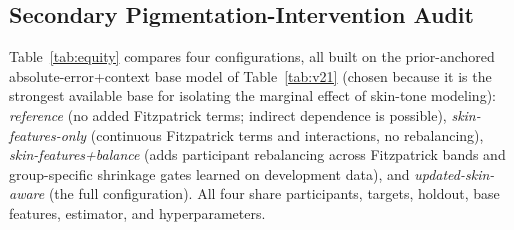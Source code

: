 \documentclass[journal]{IEEEtran}
\begin{document}
\subsection{Secondary Pigmentation-Intervention Audit}
\label{sec:equity}
Table~\ref{tab:equity} compares four configurations, all built on the prior-anchored absolute-error+context base model of Table~\ref{tab:v21} (chosen because it is the strongest available base for isolating the marginal effect of skin-tone modeling): \emph{reference} (no added Fitzpatrick terms; indirect dependence is possible), \emph{skin-features-only} (continuous Fitzpatrick terms and interactions, no rebalancing), \emph{skin-features+balance} (adds participant rebalancing across Fitzpatrick bands and group-specific shrinkage gates learned on development data), and \emph{updated-skin-aware} (the full configuration). All four share participants, targets, holdout, base features, estimator, and hyperparameters.
\begin{table}[t]
\centering
\caption{Historical Fixed-Split Skin-Tone Model Comparison (168 Evaluation Participants)}
\label{tab:equity}
\footnotesize
{}
\end{table}
\end{document}
